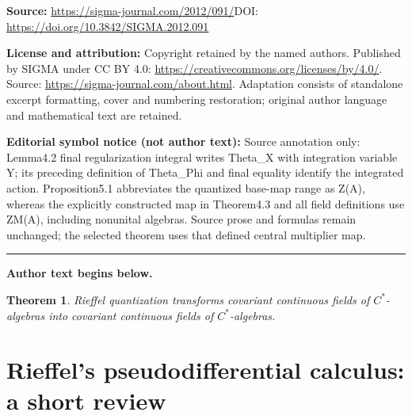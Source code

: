 \documentclass[11pt]{article}
\newtheorem{Theorem}{Theorem}[section]
\begin{document}
\noindent\textbf{Source:} \url{https://sigma-journal.com/2012/091/}\quad DOI: \url{https://doi.org/10.3842/SIGMA.2012.091}\par
\noindent\textbf{License and attribution:} Copyright retained by the named authors. Published by SIGMA under CC BY 4.0: \url{https://creativecommons.org/licenses/by/4.0/}. Source: \url{https://sigma-journal.com/about.html}. Adaptation consists of standalone excerpt formatting, cover and numbering restoration; original author language and mathematical text are retained.\par
\noindent\textbf{Editorial symbol notice (not author text):} Source annotation only: Lemma4.2 final regularization integral writes Theta\_X with integration variable Y; its preceding definition of Theta\_Phi and final equality identify the integrated action. Proposition5.1 abbreviates the quantized base-map range as Z(A), whereas the explicitly constructed map in Theorem4.3 and all field definitions use ZM(A), including nonunital algebras. Source prose and formulas remain unchanged; the selected theorem uses that defined central multiplier map.\par
\medskip\hrule\medskip\noindent\textbf{Author text begins below.}\par
\setcounter{section}{1}
\setcounter{subsection}{0}
\setcounter{subsubsection}{0}
\setcounter{Theorem}{0}
\setcounter{equation}{0}
\begin{Theorem}\label{mein}
Rieffel quantization transforms covariant continuous fields of $C^*$-algebras into
covariant continuous fields of $C^*$-algebras.
\end{Theorem}
\setcounter{section}{1}
\setcounter{subsection}{0}
\setcounter{subsubsection}{0}
\setcounter{Theorem}{1}
\setcounter{equation}{0}
\section{Rief\/fel's pseudodif\/ferential calculus: a short review}\label{sectra}
\end{document}
